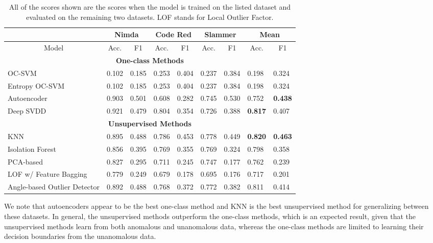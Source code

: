 \begin{table} [ht!]
\centering
\begin{tabular}{lll|ll|ll|ll}
\toprule
    & \multicolumn{2}{c|}{\textbf{Nimda}} & \multicolumn{2}{c|}{\textbf{Code Red}} & \multicolumn{2}{c|}{\textbf{Slammer}} & \multicolumn{2}{c}{\textbf{Mean}} \\
    \midrule
    \multicolumn{1}{c}{Model} & \multicolumn{1}{c}{Acc.} & \multicolumn{1}{c|}{F1} & \multicolumn{1}{c}{Acc.} & \multicolumn{1}{c|}{F1} & \multicolumn{1}{c}{Acc.} & \multicolumn{1}{c|}{F1} & \multicolumn{1}{c}{Acc.} & \multicolumn{1}{c}{F1} \\
    \bottomrule
    \toprule
    \multicolumn{9}{c}{\textbf{One-class Methods}} \\
    \midrule
    OC-SVM &0.102  &0.185  &0.253 &0.404  &0.237  &0.384  &0.198 & 0.324 \\
    Entropy OC-SVM &0.102  &0.185  &0.253 &0.404  &0.237  &0.384  &0.198 & 0.324\\
    Autoencoder & 0.903 & 0.501 & 0.608 & 0.282 & 0.745 & 0.530 & 0.752 & \textbf{0.438} \\
    Deep SVDD & 0.921 & 0.479 & 0.804 & 0.354 & 0.726 & 0.388 & \textbf{0.817} & 0.407 \\
    \bottomrule
    \toprule
    \multicolumn{9}{c}{\textbf{Unsupervised Methods}} \\
    \midrule
    KNN & 0.895 & 0.488 & 0.786 & 0.453 & 0.778 & 0.449 & \textbf{0.820} & \textbf{0.463}\\
    Isolation Forest  & 0.856 & 0.395 & 0.769 & 0.355 & 0.769 & 0.324 & 0.798 & 0.358 \\
    PCA-based & 0.827 & 0.295 & 0.711 & 0.245 & 0.747 & 0.177 & 0.762 & 0.239 \\
    LOF w/ Feature Bagging & 0.779 & 0.249 & 0.679 & 0.178 & 0.695 & 0.176 & 0.717 & 0.201 \\
    Angle-based Outlier Detector& 0.892 & 0.488 & 0.768 & 0.372 & 0.772 & 0.382 & 0.811 & 0.414\\
    \bottomrule
\end{tabular}
\caption{\label{tab:results} All of the scores shown are the scores when the model is trained on the listed dataset and evaluated on the remaining two datasets. LOF stands for Local Outlier Factor.}
\end{table}

We note that autoencoders appear to be the best one-class method and KNN is the best unsupervised method for generalizing between these datasets. In general, the unsupervised methods outperform the one-class methods, which is an expected result, given that the unsupervised methods learn from both anomalous and unanomalous data, whereas the one-class methods are limited to learning their decision boundaries from the unanomalous data. 



